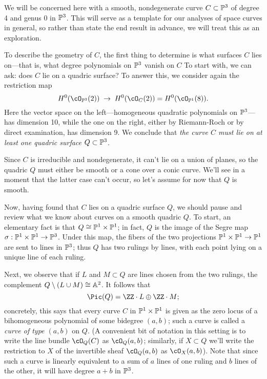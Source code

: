 We will be concerned here with  a smooth, nondegenerate curve $C \subset \PP^3$ of degree 4 and genus 0 in $\PP^3$. 
This will serve as a template for our analyses of space curves in general, so rather than state the end result in advance, we will treat this as an exploration.

To describe the geometry of $C$, the first thing to determine is what surfaces $C$ lies on---that is, what degree polynomials on $\PP^3$ vanish on $C$
To start with, we can ask: does $C$ lie on a quadric surface? To answer this, we consider again the restriction map
$$
H^0(\cO_{\PP^3}(2)) \; \to \; H^0(\cO_{C}(2)) = H^0(\cO_{\PP^1}(8)).
$$
Here the vector space on the left---homogeneous quadratic polynomials on $\PP^3$---has dimension 10, while the one on the right, either by Riemann-Roch or by direct examination, has dimension 9. We conclude that \emph{the curve $C$ must lie on at least one quadric surface $Q \subset \PP^3$}.

Since $C$ is irreducible and nondegenerate, it can't lie on a union of planes, so the quadric $Q$ must either be smooth or a cone over a conic curve. We'll see in a moment that the latter case can't occur, so let's assume for now that $Q$ is smooth. 

Now, having found that $C$ lies on a quadric surface $Q$, we should pause and review what we know about curves on a smooth quadric $Q$. To start, an elementary fact is that $Q \cong \PP^1 \times \PP^1$; in fact, $Q$ is the image of the Segre map $\sigma : \PP^1 \times \PP^1 \to \PP^3$. Under this map, the fibers of the two projections $\PP^1 \times \PP^1 \to \PP^1$ are sent to lines in $\PP^3$; thus $Q$ has two rulings by lines, with each point lying on a unique line of each ruling.

Next, we observe that if $L$ and $M \subset Q$ are lines chosen from the two rulings, the complement $Q \setminus (L \cup M) \cong \AA^2$. It follows that 
$$
\Pic (Q) = \ZZ \cdot L \oplus \ZZ\cdot M;
$$
concretely, this says that 
every curve $C$ in $\PP^1 \times \PP^1$ is given as the zero locus of a bihomogeneous polynomial of some bidegree $(a,b)$; such a curve is called a \emph{curve of type $(a,b)$} on $Q$. (A convenient bit of notation in this setting is to write the line bundle $\cO_Q(C)$ as $\cO_Q(a,b)$; similarly, if $X \subset Q$ we'll write the restriction to $X$ of the invertible sheaf $\cO_Q(a,b)$ as $\cO_X(a,b)$).
Note that since such a curve is linearly equivalent to a sum of $a$ lines of one ruling and $b$ lines of the other, it will have degree $a+b$ in $\PP^3$. 

